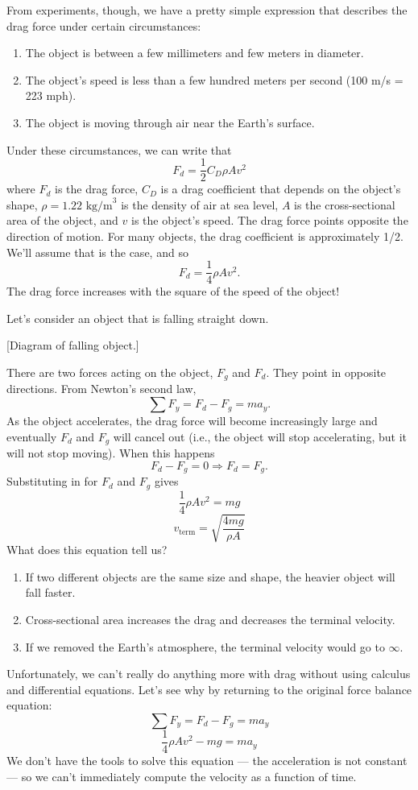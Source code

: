From experiments, though, we have a pretty simple expression that describes the drag force under certain circumstances:
\begin{enumerate}
\item The object is between a few millimeters and few meters in diameter.
\item The object's speed is less than a few hundred meters per second (100 m/s = 223 mph).
\item The object is moving through air near the Earth's surface.
\end{enumerate}
Under these circumstances, we can write that
$$\boxed{F_d=\frac{1}{2}C_D\rho Av^2}$$
where $F_d$ is the drag force, $C_D$ is a drag coefficient that depends on the object's shape, $\rho=1.22\mbox{ kg/m}^3$ is the density of air at sea level, $A$ is the cross-sectional area of the object, and $v$ is the object's speed. The drag force points opposite the direction of motion. For many objects, the drag coefficient is approximately 1/2. We'll assume that is the case, and so
$$\boxed{F_d=\frac{1}{4}\rho Av^2}.$$
The drag force increases with the square of the speed of the object!

Let's consider an object that is falling straight down.

[Diagram of falling object.]
\vspace{5cm}

There are two forces acting on the object, $F_g$ and $F_d$. They point in opposite directions. From Newton's second law,
$$\sum F_y=F_d-F_g=ma_y.$$
As the object accelerates, the drag force will become increasingly large and eventually $F_d$ and $F_g$ will cancel out (i.e., the object will stop accelerating, but it will not stop moving). When this happens
$$F_d-F_g=0\Rightarrow F_d=F_g.$$
Substituting in for $F_d$ and $F_g$ gives
$$\frac{1}{4}\rho Av^2=mg$$
$$\boxed{v_{\mbox{term}}=\sqrt{\frac{4mg}{\rho A}}}$$
What does this equation tell us?
\begin{enumerate}
\item If two different objects are the same size and shape, the heavier object will fall faster.
\item Cross-sectional area increases the drag and decreases the terminal velocity.
\item If we removed the Earth's atmosphere, the terminal velocity would go to $\infty$.
\end{enumerate}

Unfortunately, we can't really do anything more with drag without using calculus and differential equations. Let's see why by returning to the original force balance equation:
$$\sum F_y=F_d-F_g=ma_y$$
$$\frac{1}{4}\rho Av^2-mg=ma_y$$
We don't have the tools to solve this equation --- the acceleration is not constant --- so we can't immediately compute the velocity as a function of time.






\clearpage

